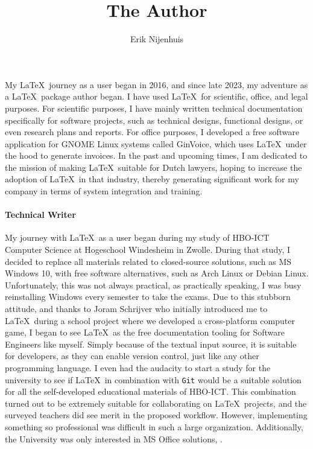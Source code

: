 \documentclass[english]{ltugboat}
\title{The Author}
\author{Erik Nijenhuis}
\begin{document}
    \maketitle

    My \LaTeX\ journey as a user began in 2016, and since late 2023, my adventure as a \LaTeX\ package author began.
    I have used \LaTeX\ for scientific, office, and legal purposes.
    For scientific purposes, I have mainly written technical documentation specifically for software projects, such as technical designs, functional designs, or even research plans and reports.
    For office purposes, I developed a free software application for GNOME Linux systems called GinVoice, which uses \LaTeX\ under the hood to generate invoices.
    In the past and upcoming times, I am dedicated to the mission of making \LaTeX\ suitable for Dutch lawyers, hoping to increase the adoption of \LaTeX\ in that industry, thereby generating significant work for my company in terms of system integration and training.

    \paragraph{Technical Writer}
    My journey with \LaTeX\ as a user began during my study of HBO-ICT Computer Science at Hogeschool Windesheim in Zwolle.
    During that study, I decided to replace all materials related to closed-source solutions, such as MS Windows 10, with free software alternatives, such as Arch Linux or Debian Linux.
    Unfortunately, this was not always practical, as practically speaking, I was busy reinstalling Windows every semester to take the exams.
    Due to this stubborn attitude, and thanks to Joram Schrijver who initially introduced me to \LaTeX\ during a school project where we developed a cross-platform computer game, I began to see \LaTeX\ as the free documentation tooling for Software Engineers like myself.
    Simply because of the textual input source, it is suitable for developers, as they can enable version control, just like any other programming language.
    I even had the audacity to start a study for the university to see if \LaTeX\ in combination with \texttt{Git} would be a suitable solution for all the self-developed educational materials of HBO-ICT\@.
    This combination turned out to be extremely suitable for collaborating on \LaTeX\ projects, and the surveyed teachers did see merit in the proposed workflow.
    However, implementing something so professional was difficult in such a large organization.
    Additionally, the University was only interested in MS Office solutions, .
\end{document}
